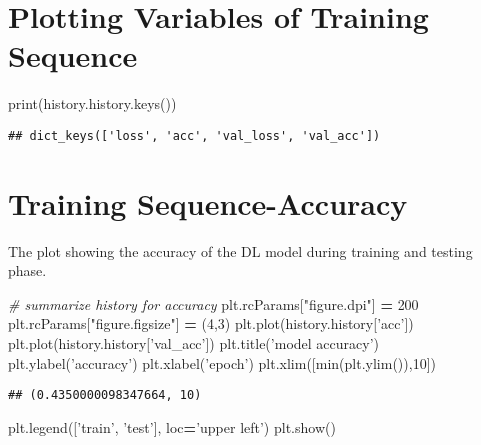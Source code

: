 \documentclass[]{book}
\newenvironment{Shaded}{\begin{snugshade}}{\end{snugshade}}
\newcommand{\BuiltInTok}[1]{#1}
\newcommand{\CommentTok}[1]{\textcolor[rgb]{0.56,0.35,0.01}{\textit{#1}}}
\newcommand{\DecValTok}[1]{\textcolor[rgb]{0.00,0.00,0.81}{#1}}
\newcommand{\NormalTok}[1]{#1}
\newcommand{\OperatorTok}[1]{\textcolor[rgb]{0.81,0.36,0.00}{\textbf{#1}}}
\newcommand{\StringTok}[1]{\textcolor[rgb]{0.31,0.60,0.02}{#1}}
\begin{document}
\hypertarget{plotting-variables-of-training-sequence}{%
\section{Plotting Variables of Training Sequence}\label{plotting-variables-of-training-sequence}}

\begin{Shaded}
\begin{Highlighting}[]
\BuiltInTok{print}\NormalTok{(history.history.keys())}
\end{Highlighting}
\end{Shaded}

\begin{verbatim}
## dict_keys(['loss', 'acc', 'val_loss', 'val_acc'])
\end{verbatim}

\hypertarget{training-sequence-accuracy}{%
\section{Training Sequence-Accuracy}\label{training-sequence-accuracy}}

The plot showing the accuracy of the DL model during training and testing phase.

\begin{Shaded}
\begin{Highlighting}[]
\CommentTok{# summarize history for accuracy}
\NormalTok{plt.rcParams[}\StringTok{"figure.dpi"}\NormalTok{] }\OperatorTok{=} \DecValTok{200}
\NormalTok{plt.rcParams[}\StringTok{"figure.figsize"}\NormalTok{] }\OperatorTok{=}\NormalTok{ (}\DecValTok{4}\NormalTok{,}\DecValTok{3}\NormalTok{)}
\NormalTok{plt.plot(history.history[}\StringTok{'acc'}\NormalTok{])}
\NormalTok{plt.plot(history.history[}\StringTok{'val_acc'}\NormalTok{])}
\NormalTok{plt.title(}\StringTok{'model accuracy'}\NormalTok{)}
\NormalTok{plt.ylabel(}\StringTok{'accuracy'}\NormalTok{)}
\NormalTok{plt.xlabel(}\StringTok{'epoch'}\NormalTok{)}
\NormalTok{plt.xlim([}\BuiltInTok{min}\NormalTok{(plt.ylim()),}\DecValTok{10}\NormalTok{])}
\end{Highlighting}
\end{Shaded}

\begin{verbatim}
## (0.4350000098347664, 10)
\end{verbatim}

\begin{Shaded}
\begin{Highlighting}[]
\NormalTok{plt.legend([}\StringTok{'train'}\NormalTok{, }\StringTok{'test'}\NormalTok{], loc}\OperatorTok{=}\StringTok{'upper left'}\NormalTok{)}
\NormalTok{plt.show()}
\end{Highlighting}
\end{Shaded}
\end{document}
